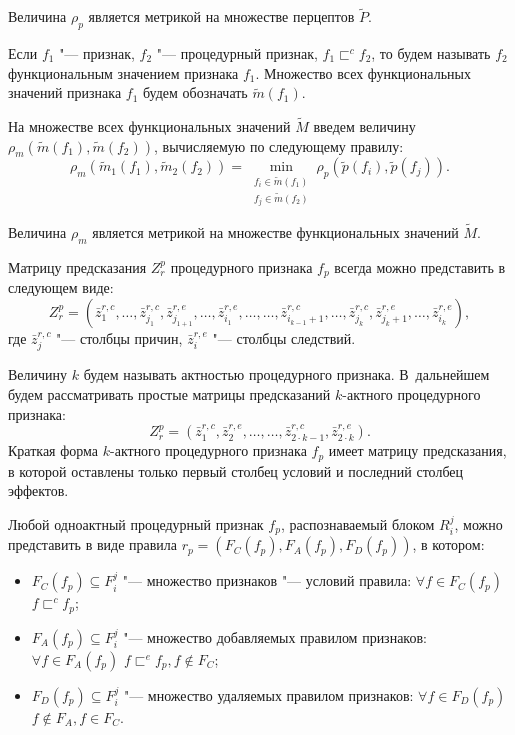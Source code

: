 \begin{Pred}
	Величина $\rho_p$ является метрикой на множестве перцептов $\tilde P$.
\end{Pred}

\begin{Def}
	Если $f_1$ "--- признак, $f_2$ "--- процедурный признак, $f_1\sqsubset^c f_2$, то будем называть $f_2$ функциональным значением признака $f_1$. Множество всех функциональных значений признака $f_1$ будем обозначать $\tilde m(f_1)$.
\end{Def}

На множестве всех функциональных значений $\tilde M$ введем величину $\rho_m(\tilde m(f_1),\tilde m(f_2))$, вычисляемую по следующему правилу:
\begin{equation}
	\rho_m(\tilde m_1(f_1),\tilde m_2(f_2 ))=\min\limits_{\substack{f_i\in\tilde m(f_1 )\\f_j\in\tilde m(f_2 )}}\rho_p(\tilde p(f_i ),\tilde p(f_j )).
\end{equation}

\begin{Pred}
	Величина $\rho_m$ является метрикой на множестве функциональных значений $\tilde M$.
\end{Pred}

Матрицу предсказания $Z_r^p$ процедурного признака $f_p$ всегда можно представить в следующем виде:
\[
	Z_r^p=(\bar z_1^{r,c},\dots,\bar z_{j_1}^{r,c},\bar z_{j_{1+1}}^{r,e},\dots,\bar z_{i_1}^{r,e},\dots,\dots,\bar z_{i_{k-1}+1}^{r,c},\dots,\bar z_{j_k}^{r,c},\bar z_{j_k+1}^{r,e},\dots,\bar z_{i_k}^{r,e}),
\]
где $\bar z_j^{r,c}$ "--- столбцы причин, $\bar z_i^{r,e}$ "--- столбцы следствий. 

Величину $k$ будем называть актностью процедурного признака. В~дальнейшем будем рассматривать простые матрицы предсказаний $k$-актного процедурного признака:
\[
	Z_r^p=(\bar z_1^{r,c},\bar z_2^{r,e},\dots,\dots,\bar z_{2\cdot k-1}^{r,c},\bar z_{2\cdot k}^{r,e}).
\]
Краткая форма $k$-актного процедурного признака $f_p$ имеет матрицу предсказания, в которой оставлены только первый столбец условий и последний столбец эффектов.

Любой одноактный процедурный признак $f_p$, распознаваемый блоком $R_i^j$, можно представить в виде правила $r_p=(F_C(f_p),F_A(f_p),F_D(f_p))$, в котором:
\begin{itemize}
	\item $F_C (f_p )\subseteq F_i^j$ "--- множество признаков "--- условий правила: $\forall f\in F_C(f_p)$ $f\sqsubset^c f_p$;
	\item $F_A(f_p)\subseteq F_i^j$ "--- множество добавляемых правилом признаков: $\forall f\in F_A(f_p)$ $f\sqsubset^e f_p,f\notin F_C$;
	\item $F_D(f_p)\subseteq F_i^j$ "--- множество удаляемых правилом признаков: $\forall f\in F_D(f_p)$ $f\notin F_A,f\in F_C$.
\end{itemize}

